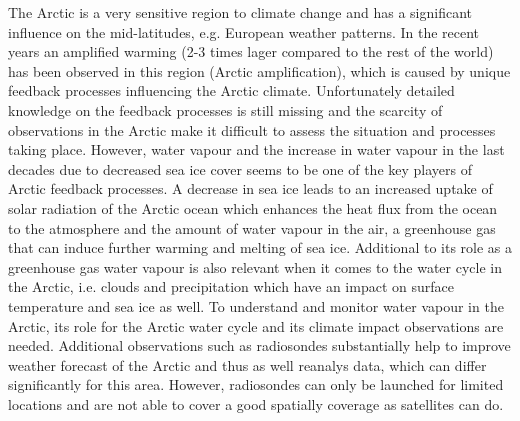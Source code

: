 \documentclass[12pt,oneside,a4paper]{article}
\begin{document}
The Arctic is a very sensitive region to climate change and has a significant influence on the mid-latitudes, e.g. European weather patterns. In the recent years an amplified warming (2-3 times lager compared to the rest of the world) has been observed in this region (Arctic amplification), which is caused by unique feedback processes influencing the Arctic climate. Unfortunately detailed knowledge on the feedback processes is still missing and the scarcity of observations in the Arctic make it difficult to assess the situation and processes taking place. However, water vapour and the increase in water vapour in the last decades due to decreased sea ice cover seems to be one of the key players of Arctic feedback processes. %
A decrease in sea ice leads to an increased uptake of solar radiation of the Arctic ocean which enhances the heat flux from the ocean to the atmosphere and the amount of water vapour in the air, a greenhouse gas that can induce further warming and melting of sea ice. %
Additional to its role as a greenhouse gas water vapour is also relevant when it comes to the water cycle in the Arctic, i.e. clouds and precipitation which have an impact on surface temperature and sea ice as well. %
To understand and monitor water vapour in the Arctic, its role for the Arctic water cycle and its climate impact observations are needed. %
Additional observations such as radiosondes substantially help to improve weather forecast of the Arctic and thus as well reanalys data, which can differ significantly for this area. %
However, radiosondes can only be launched for limited locations and are not able to cover a good spatially coverage as satellites can do. 

%
%
%
%
\end{document}
